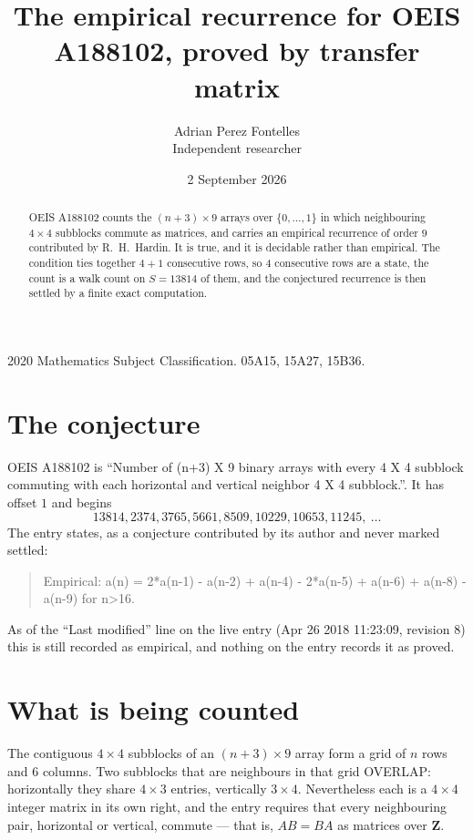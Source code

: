 \documentclass[11pt,a4paper]{article}
\title{The empirical recurrence for OEIS A188102, proved by transfer matrix}
\author{Adrian Perez Fontelles\\ \small Independent researcher}
\date{2 September 2026}
\theoremstyle{plain}
\theoremstyle{definition}
\begin{document}
\maketitle

\begin{abstract}
OEIS A188102 counts the $(n+3)\times9$ arrays over $\{0,\dots,1\}$ in which
neighbouring $4\times4$ subblocks commute as matrices, and carries an empirical
recurrence
of order $9$ contributed by R.~H.~Hardin. It is true, and it is decidable rather than
empirical. The condition ties together $4+1$ consecutive rows, so $4$ consecutive rows are
a state, the count is a walk count on $S=13814$ of them, and the conjectured recurrence is then
settled by a finite exact computation.
\end{abstract}

\noindent\small 2020 Mathematics Subject Classification. 05A15, 15A27, 15B36.\normalsize

\section{The conjecture}

OEIS A188102 is ``Number of (n+3) X 9 binary arrays with every 4 X 4 subblock commuting with each horizontal and vertical neighbor 4 X 4 subblock.''. It has offset $1$ and begins
\[
13814, 2374, 3765, 5661, 8509, 10229, 10653, 11245,\ \dots
\]
The entry states, as a conjecture contributed by its author and never marked settled:
\begin{quote}
Empirical: a(n) = 2*a(n-1) - a(n-2) + a(n-4) - 2*a(n-5) + a(n-6) + a(n-8) - a(n-9) for n>16.
\end{quote}
As of the ``Last modified'' line on the live entry (Apr 26 2018 11:23:09, revision 8) this is still
recorded as empirical, and nothing on the entry records it as proved.

\section{What is being counted}

The contiguous $4\times4$ subblocks of an $(n+3)\times9$ array form a grid of $n$
rows and $6$ columns. Two subblocks that are neighbours in that
grid OVERLAP: horizontally they share $4\times3$ entries, vertically
$3\times4$. Nevertheless each is a $4\times4$ integer matrix in its own right, and
the entry requires that every neighbouring pair, horizontal or vertical, commute --- that is,
$AB=BA$ as matrices over $\mathbf{Z}$.
\end{document}
